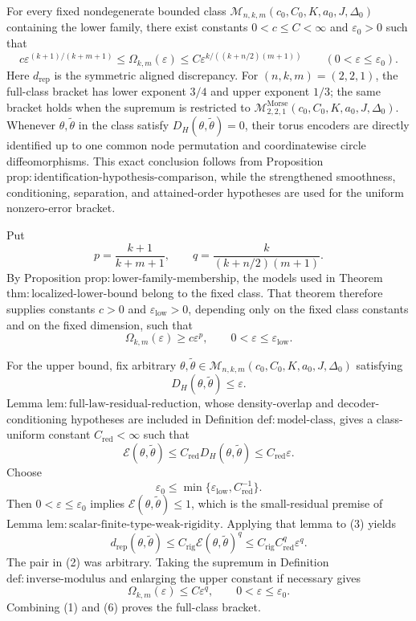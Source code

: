 For every fixed nondegenerate bounded class \(\mathcal M_{n,k,m}(c_0,C_0,K,a_0,J,\Delta_0)\) containing the lower family, there exist constants \(0<c\leq C<\infty\) and \(\varepsilon_0>0\) such that
\[
c\varepsilon^{(k+1)/(k+m+1)}
\leq \Omega_{k,m}(\varepsilon)
\leq C\varepsilon^{k/((k+n/2)(m+1))}
\qquad (0<\varepsilon\leq\varepsilon_0).
\]
Here \(d_{\mathrm{rep}}\) is the symmetric aligned discrepancy. For \((n,k,m)=(2,2,1)\), the full-class bracket has lower exponent \(3/4\) and upper exponent \(1/3\); the same bracket holds when the supremum is restricted to \(\mathcal M^{\mathrm{Morse}}_{2,2,1}(c_0,C_0,K,a_0,J,\Delta_0)\). Whenever \(\theta,\widetilde\theta\) in the class satisfy \(D_H(\theta,\widetilde\theta)=0\), their torus encoders are directly identified up to one common node permutation and coordinatewise circle diffeomorphisms. This exact conclusion follows from Proposition \(\mathrm{prop:identification\text{-}hypothesis\text{-}comparison}\), while the strengthened smoothness, conditioning, separation, and attained-order hypotheses are used for the uniform nonzero-error bracket.

Put
\[
p=\frac{k+1}{k+m+1},
\qquad
q=\frac{k}{(k+n/2)(m+1)}.
\]
By Proposition \(\mathrm{prop:lower\text{-}family\text{-}membership}\), the models used in Theorem \(\mathrm{thm:localized\text{-}lower\text{-}bound}\) belong to the fixed class. That theorem therefore supplies constants \(c>0\) and \(\varepsilon_{\mathrm{low}}>0\), depending only on the fixed class constants and on the fixed dimension, such that
\[
\Omega_{k,m}(\varepsilon)
\geq c\varepsilon^p,
\qquad
0<\varepsilon\leq\varepsilon_{\mathrm{low}}.
\tag{1}
\]

For the upper bound, fix arbitrary \(\theta,\widetilde\theta\in\mathcal M_{n,k,m}(c_0,C_0,K,a_0,J,\Delta_0)\) satisfying
\[
D_H(\theta,\widetilde\theta)\leq\varepsilon.
\tag{2}
\]
Lemma \(\mathrm{lem:full\text{-}law\text{-}residual\text{-}reduction}\), whose density-overlap and decoder-conditioning hypotheses are included in Definition \(\mathrm{def:model\text{-}class}\), gives a class-uniform constant \(C_{\mathrm{red}}<\infty\) such that
\[
\mathcal E(\theta,\widetilde\theta)
\leq C_{\mathrm{red}}D_H(\theta,\widetilde\theta)
\leq C_{\mathrm{red}}\varepsilon.
\tag{3}
\]
Choose
\[
\varepsilon_0
\leq
\min\{\varepsilon_{\mathrm{low}},C_{\mathrm{red}}^{-1}\}.
\tag{4}
\]
Then \(0<\varepsilon\leq\varepsilon_0\) implies \(\mathcal E(\theta,\widetilde\theta)\leq1\), which is the small-residual premise of Lemma \(\mathrm{lem:scalar\text{-}finite\text{-}type\text{-}weak\text{-}rigidity}\). Applying that lemma to (3) yields
\[
d_{\mathrm{rep}}(\theta,\widetilde\theta)
\leq C_{\mathrm{rig}}\mathcal E(\theta,\widetilde\theta)^q
\leq C_{\mathrm{rig}}C_{\mathrm{red}}^q\varepsilon^q.
\tag{5}
\]
The pair in (2) was arbitrary. Taking the supremum in Definition \(\mathrm{def:inverse\text{-}modulus}\) and enlarging the upper constant if necessary gives
\[
\Omega_{k,m}(\varepsilon)
\leq C\varepsilon^q,
\qquad
0<\varepsilon\leq\varepsilon_0.
\tag{6}
\]
Combining (1) and (6) proves the full-class bracket.

